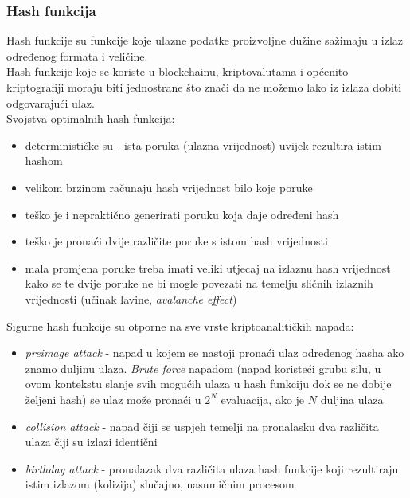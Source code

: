 \documentclass[12pt]{article}
\begin{document}
\subsubsection{Hash funkcija}
Hash funkcije su funkcije koje ulazne podatke proizvoljne dužine sažimaju u izlaz određenog formata i veličine.\\
Hash funkcije koje se koriste u blockchainu, kriptovalutama i općenito kriptografiji moraju biti jednostrane što znači da ne možemo lako iz izlaza dobiti odgovarajući ulaz.\\
Svojstva optimalnih hash funkcija:
\begin{itemize}
	\item determinističke su - ista poruka (ulazna vrijednost) uvijek rezultira istim hashom
	\item velikom brzinom računaju hash vrijednost bilo koje poruke
	\item teško je i nepraktično generirati poruku koja daje određeni hash
	\item teško je pronaći dvije različite poruke s istom hash vrijednosti
	\item mala promjena poruke treba imati veliki utjecaj na izlaznu hash vrijednost kako se te dvije poruke ne bi mogle povezati na temelju sličnih izlaznih vrijednosti (učinak lavine, \textit{avalanche effect})\cite{ideal-hash-fun}
\end{itemize}
%
Sigurne hash funkcije su otporne na sve vrste kriptoanalitičkih napada:
\begin{itemize}
	\item \textit{preimage attack} - napad u kojem se nastoji pronaći ulaz određenog hasha ako znamo duljinu ulaza. \textit{Brute force} napadom (napad koristeći grubu silu, u ovom kontekstu slanje svih mogućih ulaza u hash funkciju dok se ne dobije željeni hash) se ulaz može pronaći u $2^N$ evaluacija, ako je $N$ duljina ulaza
	\item \textit{collision attack} - napad čiji se uspjeh temelji na pronalasku dva različita ulaza čiji su izlazi identični
	\item \textit{birthday attack} - pronalazak dva različita ulaza hash funkcije koji rezultiraju istim izlazom (kolizija) slučajno, nasumičnim procesom
\end{itemize}
\end{document}
